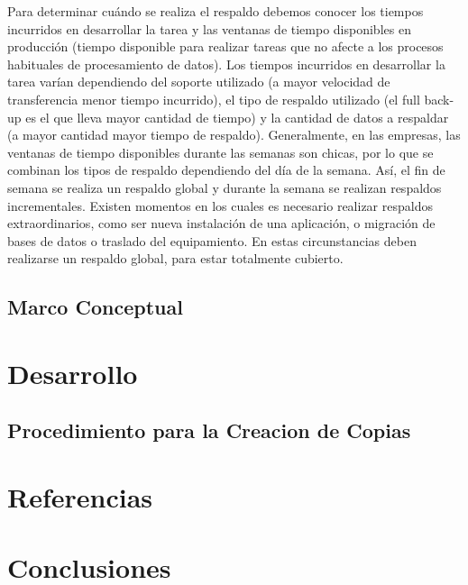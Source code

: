 \documentclass[12pt,letterpaper]{article}
\begin{document}
Para determinar cuándo se realiza el respaldo debemos conocer los tiempos incurridos en desarrollar la tarea y las ventanas de tiempo disponibles en producción (tiempo disponible para realizar tareas que no afecte a los procesos habituales de procesamiento de datos). Los tiempos incurridos en desarrollar la tarea varían dependiendo del soporte utilizado (a mayor velocidad de transferencia menor tiempo incurrido), el tipo de respaldo utilizado (el full back-up es el que lleva mayor cantidad de tiempo) y la cantidad de datos a respaldar (a mayor cantidad mayor tiempo de respaldo). 
Generalmente, en las empresas, las ventanas de tiempo disponibles durante las semanas son chicas, por lo que se combinan los tipos de respaldo  dependiendo del día de la semana. Así, el fin de semana se realiza un respaldo global y durante la semana se realizan respaldos incrementales. Existen momentos en los cuales es necesario realizar respaldos extraordinarios, como ser nueva instalación de una aplicación, o migración de bases de datos o traslado del equipamiento. En estas circunstancias deben realizarse un respaldo global, para estar totalmente cubierto. \\







\subsection{Marco Conceptual}

\newpage

\section{Desarrollo}
\subsection{Procedimiento para la Creacion de Copias}

\newpage
\section{Referencias}
\newpage 
\section{Conclusiones} 
\end{document}
